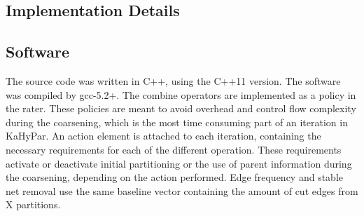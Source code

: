 \documentclass[a4paper,12pt,titlepage, BCOR7mm,headsepline]{scrbook}
\numberwithin{equation}{section}
\begin{document}
\clearpage
\begin{appendix}
\chapter{Implementation Details}
\section{Software}
The source code was written in C++, using the C++11 version. The software was compiled by gcc-5.2+. The combine operators are implemented as a policy in the rater. These policies are meant to avoid overhead and control flow complexity during the coarsening, which is the most time consuming part of an iteration in KaHyPar. An action element is attached to each iteration, containing the necessary requirements for each of the different operation. These requirements activate or deactivate 
initial partitioning or the use of parent information during the coarsening, depending on the action performed. Edge frequency and stable net removal use the same baseline vector containing the amount of cut edges from X partitions. 

\end{appendix}


\end{document}
